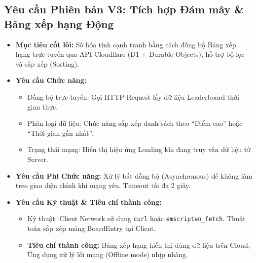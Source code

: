 \documentclass[12pt,a4paper]{article}
\begin{document}
\subsection{Yêu cầu Phiên bản V3: Tích hợp Đám mây \& Bảng xếp hạng Động}
\begin{itemize}[leftmargin=*]
    \item \textbf{Mục tiêu cốt lõi:} Số hóa tính cạnh tranh bằng cách đồng bộ Bảng xếp hạng trực tuyến qua API Cloudflare (D1 + Durable Objects), hỗ trợ bộ lọc và sắp xếp (Sorting).
    \item \textbf{Yêu cầu Chức năng:}
    \begin{itemize}[noitemsep]
        \item Đồng bộ trực tuyến: Gọi HTTP Request lấy dữ liệu Leaderboard thời gian thực.
        \item Phân loại dữ liệu: Chức năng sắp xếp danh sách theo ``Điểm cao'' hoặc ``Thời gian gần nhất''.
        \item Trạng thái mạng: Hiển thị hiệu ứng Loading khi đang truy vấn dữ liệu từ Server.
    \end{itemize}
    \item \textbf{Yêu cầu Phi Chức năng:} Xử lý bất đồng bộ (Asynchronous) để không làm treo giao diện chính khi mạng yếu. Timeout tối đa 2 giây.
    \item \textbf{Yêu cầu Kỹ thuật \& Tiêu chí thành công:}
    \begin{itemize}[noitemsep]
        \item Kỹ thuật: Client Network sử dụng \texttt{curl} hoặc \texttt{emscripten\_fetch}. Thuật toán sắp xếp mảng BoardEntry tại Client.
        \item \textbf{Tiêu chí thành công:} Bảng xếp hạng hiển thị đúng dữ liệu trên Cloud; Ứng dụng xử lý lỗi mạng (Offline mode) nhịp nhàng.
    \end{itemize}
\end{itemize}

\label{LastPageGameConsoleRequirements}
\end{document}
